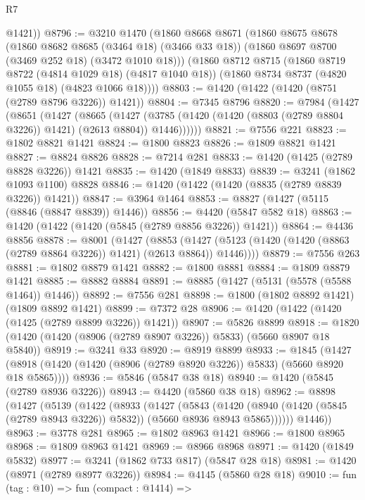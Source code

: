 \begin{lexlean}{R7}
\begin{coremodule}
        @1421))
@8796 := @3210
    @1470
    (@1860
      @8668
      @8671
      (@1860
        @8675
        @8678
        (@1860 @8682 @8685 (@3464 @18) (@3466 @33 @18))
        (@1860 @8697 @8700 (@3469 @252 @18) (@3472 @1010 @18)))
      (@1860
        @8712
        @8715
        (@1860 @8719 @8722 (@4814 @1029 @18) (@4817 @1040 @18))
        (@1860 @8734 @8737 (@4820 @1055 @18) (@4823 @1066 @18))))
@8803 := @1420 (@1422 (@1420 (@8751 (@2789 @8796 @3226)) @1421))
@8804 := @7345 @8796
@8820 := @7984
    (@1427
      (@8651
        (@1427
          (@8665
            (@1427
              (@3785 (@1420 (@1420 (@8803 (@2789 @8804 @3226)) @1421) (@2613 @8804)) @1446))))))
@8821 := @7556 @221
@8823 := @1802 @8821 @1421
@8824 := @1800 @8823
@8826 := @1809 @8821 @1421
@8827 := @8824 @8826
@8828 := @7214 @281
@8833 := @1420 (@1425 (@2789 @8828 @3226)) @1421
@8835 := @1420 (@1849 @8833)
@8839 := @3241 (@1862 @1093 @1100) @8828
@8846 := @1420 (@1422 (@1420 (@8835 (@2789 @8839 @3226)) @1421))
@8847 := @3964 @1464
@8853 := @8827 (@1427 (@5115 (@8846 (@8847 @8839)) @1446))
@8856 := @4420 (@5847 @582 @18)
@8863 := @1420 (@1422 (@1420 (@5845 (@2789 @8856 @3226)) @1421))
@8864 := @4436 @8856
@8878 := @8001
    (@1427
      (@8853 (@1427 (@5123 (@1420 (@1420 (@8863 (@2789 @8864 @3226)) @1421) (@2613 @8864)) @1446))))
@8879 := @7556 @263
@8881 := @1802 @8879 @1421
@8882 := @1800 @8881
@8884 := @1809 @8879 @1421
@8885 := @8882 @8884
@8891 := @8885 (@1427 (@5131 (@5578 (@5588 @1464)) @1446))
@8892 := @7556 @281
@8898 := @1800 (@1802 @8892 @1421) (@1809 @8892 @1421)
@8899 := @7372 @28
@8906 := @1420 (@1422 (@1420 (@1425 (@2789 @8899 @3226)) @1421))
@8907 := @5826 @8899
@8918 := @1820 (@1420 (@1420 (@8906 (@2789 @8907 @3226)) @5833) (@5660 @8907 @18 @5840))
@8919 := @3241 @33
@8920 := @8919 @8899
@8933 := @1845
    (@1427 (@8918 (@1420 (@1420 (@8906 (@2789 @8920 @3226)) @5833) (@5660 @8920 @18 @5865))))
@8936 := @5846 (@5847 @38 @18)
@8940 := @1420 (@5845 (@2789 @8936 @3226))
@8943 := @4420 (@5860 @38 @18)
@8962 := @8898
    (@1427
      (@5139
        (@1422
          (@8933
            (@1427
              (@5843
                (@1420
                  (@8940 (@1420 (@5845 (@2789 @8943 @3226)) @5832))
                  (@5660 @8936 @8943 @5865))))))
        @1446))
@8963 := @3778 @281
@8965 := @1802 @8963 @1421
@8966 := @1800 @8965
@8968 := @1809 @8963 @1421
@8969 := @8966 @8968
@8971 := @1420 (@1849 @5832)
@8977 := @3241 (@1862 @733 @817) (@5847 @28 @18)
@8981 := @1420 (@8971 (@2789 @8977 @3226))
@8984 := @4145 (@5860 @28 @18)
@9010 := fun (tag : @10) =>
  fun (compact : @1414) =>

\end{coremodule}
\end{lexlean}
